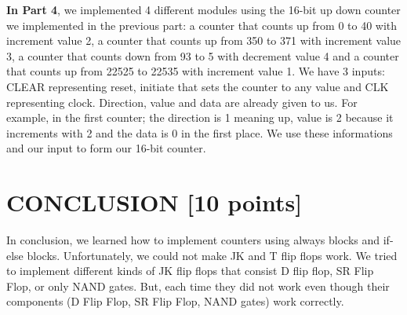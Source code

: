 \documentclass[pdftex,12pt,a4paper]{article}
\begin{document}
\textbf{In Part 4}, we implemented 4 different modules using the 16-bit up down counter we implemented in the previous part: a counter that counts up from 0 to 40 with increment value 2, a counter that counts up from 350 to 371 with increment value 3, a counter that counts down from 93 to 5 with decrement value 4 and a counter that counts up from 22525 to 22535 with increment value 1. We have 3 inputs: CLEAR representing reset, initiate that sets the counter to any value and CLK representing clock. Direction, value and data are already given to us. For example, in the first counter; the direction is 1 meaning up, value is 2 because it increments with 2 and the data is 0 in the first place. We use these informations and our input to form our 16-bit counter.




\section{CONCLUSION [10 points]}

In conclusion, we learned how to implement counters using always blocks and if-else blocks. Unfortunately, we could not make JK and T flip flops work. We tried to implement different kinds of JK flip flops that consist D flip flop, SR Flip Flop, or only NAND gates. But, each time they did not work even though their components (D Flip Flop, SR Flip Flop, NAND gates) work correctly.
\end{document}
